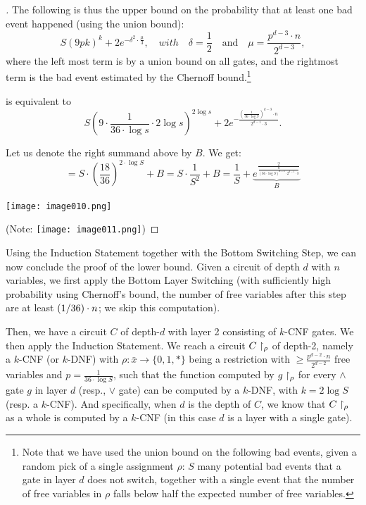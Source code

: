 \begin{proof}[]
The following is thus the upper bound on the probability that at least one bad event happened (using the union bound): 
\begin{equation}\label{eq:487:28}
 S(9pk)^k + 2e^{-\delta^2 \cdot \frac{\mu}{3}}, \quad with \quad \delta = \frac{1}{2} \quad \text{and} \quad \mu = \frac{p^{d-3} \cdot n}{2^{d-3}},
\end{equation}
where the left most term is by a union bound on all gates, and the rightmost term is the bad event estimated by the  Chernoff bound.\footnote{%
Note that we have used the union bound on the following bad events, given a random pick of a single assignment $\rho$: $S$ many potential bad events that a gate in layer $d$ does not switch, together with a single event that the number of free variables in $\rho$ falls below half the expected number of free variables.
}



 is equivalent to 
\[
S \left( 9 \cdot \frac{1}{36 \cdot \log s} \cdot 2 \log s \right)^{2 \log s} + 
2 e^{-\frac{\left(\frac{1}{36 \cdot \log S }\right)^{d-3} \cdot n}{2^{d-1} \cdot 3}}.
\]


Let us denote the right summand above by $B$. 
We get:
$$
=S \cdot\left(\frac{18}{36}\right)^{2 \cdot \log S}+B =S \cdot \frac{1}{S^2}+B =
\frac{1}{S}+
\underbrace{
    e^{
        \frac{2}{
        \frac{n}{{(36 \cdot \log S)^{d-3} \cdot 2^{d-1} \cdot 3}}}}
}_B
$$

\texttt{[image: image010.png]}

(Note: \texttt{[image: image011.png]})
\mbox{}
\end{proof} %


Using the Induction Statement together with the Bottom Switching Step,
we can now conclude the proof of the lower bound.
Given a circuit of depth $d$ with $n$ variables,
we first apply the Bottom Layer Switching (with sufficiently high probability using Chernoff's bound, the number of free variables after this step
are at least $(1/36)\cdot n$; we skip this computation).

Then, we have a circuit $C$ of depth-$d$ with layer 2 consisting of  $k$-CNF gates. We  then apply the Induction Statement. We reach a circuit $C \upharpoonright_\rho$ of depth-2, namely a $k$-CNF (or $k$-DNF) with
$\rho: \bar{x} \rightarrow\{0,1, *\}$ being a restriction
with $\geq \frac{p^{d-2} \cdot n}{2^{d-2}}$ free variables and $p=\frac{1}{36 \cdot \log S}$, such that the function computed by $g\upharpoonright_\rho$ for every $\land$ gate $g$ in layer $d$ (resp., $\lor$ gate) can be computed by a $k$-DNF, with $k=2 \log S$ (resp. a $k$-CNF).
And specifically, when $d$ is the depth of $C$, we know that $C\upharpoonright_\rho$ as a whole is computed by a $k$-CNF (in this case $d$ is a layer with a single gate). 


